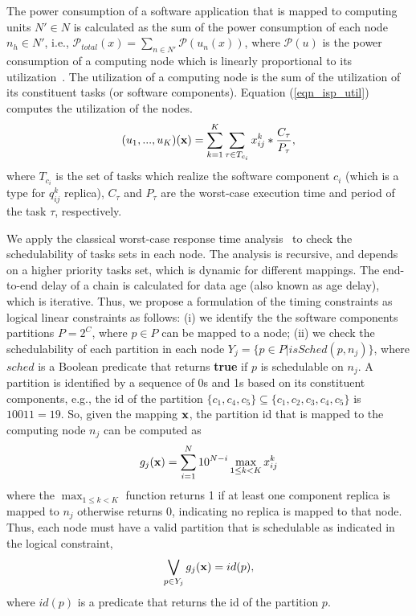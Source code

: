 The power consumption of a software application that is mapped to computing units $N'\in N$ is calculated as the sum of the power consumption of each node $n_h\in N'$, i.e., $\mathcal{P}_{total}(x)=\sum_{n\in N'}{\mathcal{P}(u_n(x))}$, where $\mathcal{P}(u)$ is the power consumption of a computing node which is linearly proportional to its utilization~\cite{Mahmud5222}. The utilization of a computing node is the sum of the utilization of its constituent tasks (or software components). Equation (\ref{eqn_isp_util}) computes the utilization of the nodes.
\begin{align}
\label{eqn_isp_util}
	(u_1,...,u_K)(\x)=\sum_{k=1}^{K}\sum_{\tau\in T_{c_i}}{\xkij*\frac{C_\tau}{P_\tau}},
\end{align}
where $T_{c_i}$ is the set of tasks which realize the software component $c_i$ (which is a type for $q^{k}_{ij}$ replica), $C_\tau$ and $P_\tau$ are the worst-case execution time and  period of the task $\tau$, respectively.

We apply the classical worst-case response time analysis~\cite{Baruah2011Response-timeSystems} to check the schedulability of tasks sets in each node. The analysis is recursive, and depends on a higher priority tasks set, which is dynamic for different mappings. The end-to-end delay of a chain is calculated for data age (also known as age delay), which is iterative. Thus, we propose a formulation of the timing constraints as logical linear constraints as follows: (i) we identify the the software components partitions $P=2^C$, where $p\in P$ can be mapped to a node; (ii) we check the schedulability of each partition in each node $Y_j=\{p\in P| isSched(p,n_j)\}$, where $sched$ is a Boolean predicate that returns \textbf{true} if $p$ is schedulable on $n_j$.  A partition is identified by a sequence of 0s and 1s based on its constituent components, e.g., the id of the partition $\{c_1,c_4,c_5\}\subseteq \{c_1,c_2,c_3,c_4,c_5\}$ is $10011=19$. So, given the mapping $\textbf{x}$, the partition id that is mapped to the computing node $n_j$ can be computed as
\begin{align}
	g_j(\textbf{x})=\sum_{i=1}^{N}{10^{N-i}\max_{1\leq k< K}x^{k}_{ij}}
\end{align}
where the $\max_{1\leq k< K}$ function returns 1 if at least one component replica is mapped to $n_j$ otherwise returns 0, indicating no replica is mapped to that node. Thus, each node must have a valid partition that is schedulable as indicated in the logical constraint,
\begin{align}
\bigvee\limits_{p\in Y_j}g_j (\textbf{x})= id(p) ,
\end{align}
where $id(p)$ is a predicate that returns the id of the partition $p$.

